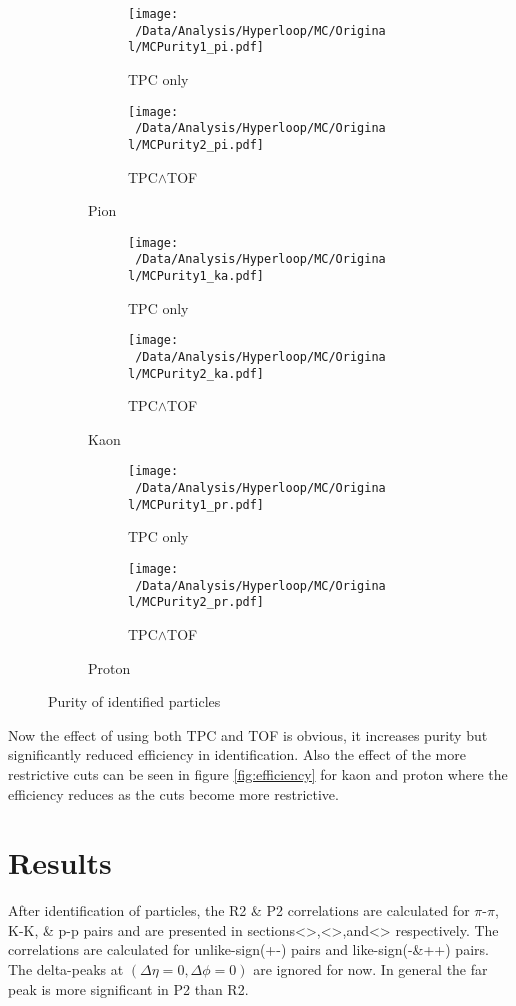 \documentclass[12pt,a4paper,twoside]{report}
\begin{document}
\begin{figure}[H]
	\begin{subfigure}{\linewidth}
		\begin{subfigure}{0.49\linewidth}
			\texttt{[image: ~/Data/Analysis/Hyperloop/MC/Original/MCPurity1\_pi.pdf]}
			\caption*{TPC only}
		\end{subfigure}
		\begin{subfigure}{0.49\linewidth}
			\texttt{[image: ~/Data/Analysis/Hyperloop/MC/Original/MCPurity2\_pi.pdf]}
			\caption*{TPC$\land$TOF}
		\end{subfigure}
		\caption{Pion}
	\end{subfigure}
	\begin{subfigure}{\linewidth}
		\begin{subfigure}{0.49\linewidth}
			\texttt{[image: ~/Data/Analysis/Hyperloop/MC/Original/MCPurity1\_ka.pdf]}
			\caption*{TPC only}
		\end{subfigure}
		\begin{subfigure}{0.49\linewidth}
			\texttt{[image: ~/Data/Analysis/Hyperloop/MC/Original/MCPurity2\_ka.pdf]}
			\caption*{TPC$\land$TOF}
		\end{subfigure}
		\caption{Kaon}
	\end{subfigure}
	\begin{subfigure}{\linewidth}
		\begin{subfigure}{0.49\linewidth}
			\texttt{[image: ~/Data/Analysis/Hyperloop/MC/Original/MCPurity1\_pr.pdf]}
			\caption*{TPC only}
		\end{subfigure}
		\begin{subfigure}{0.49\linewidth}
			\texttt{[image: ~/Data/Analysis/Hyperloop/MC/Original/MCPurity2\_pr.pdf]}
			\caption*{TPC$\land$TOF}
		\end{subfigure}
		\caption{Proton}
	\end{subfigure}
	\caption{\label{fig:purity}Purity of identified particles}
\end{figure}
Now the effect of using both TPC and TOF is obvious, it increases purity but significantly reduced efficiency in identification. Also the effect of the more restrictive cuts can be seen in figure \ref{fig:efficiency} for kaon and proton where the efficiency reduces as the cuts become more restrictive.
\chapter{Results}\label{Ch:Results}
After identification of particles, the R2 \& P2 correlations are calculated for $\pi$-$\pi$, K-K, \& p-p pairs and are presented in sections<>,<>,and<> respectively. The correlations are calculated for unlike-sign(+-) pairs and like-sign(-\-\&++) pairs. The delta-peaks at $(\Delta\eta=0,\Delta\phi=0)$ are ignored for now.
In general the far peak is more significant in P2 than R2.
\end{document}
